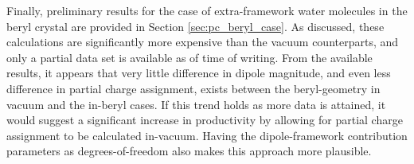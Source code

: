     Finally, preliminary results for the case of extra-framework water molecules in the beryl crystal are provided in Section \ref{sec:pc_beryl_case}. As discussed, these calculations are significantly more expensive than the vacuum counterparts, and only a partial data set is available as of time of writing. From the available results, it appears that very little difference in dipole magnitude, and even less difference in partial charge assignment, exists between the beryl-geometry in vacuum and the in-beryl cases. If this trend holds as more data is attained, it would suggest a significant increase in productivity by allowing for partial charge assignment to be calculated in-vacuum. Having the dipole-framework contribution parameters as degrees-of-freedom also makes this approach more plausible.